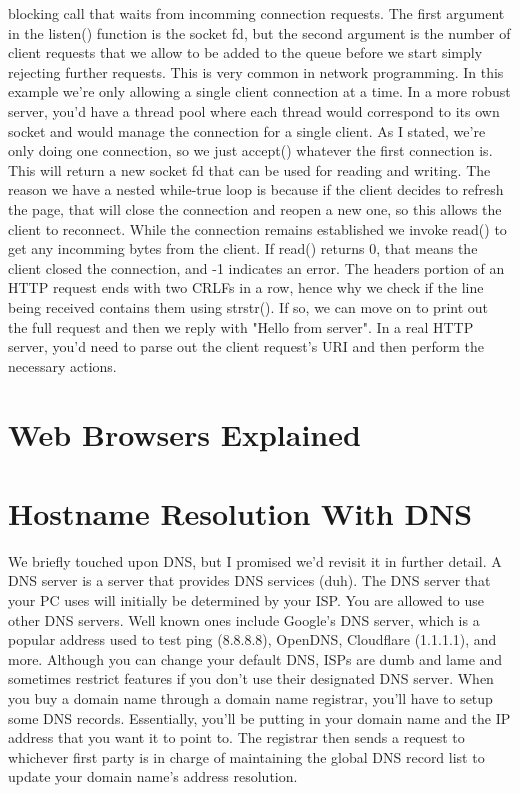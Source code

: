 \documentclass{article}
\begin{document}
blocking call that waits from incomming connection requests. The first argument in the listen() function is
the socket fd, but the second argument is the number of client requests that we allow to be added to the queue
before we start simply rejecting further requests. This is very common in network programming. In this example
we're only allowing a single client connection at a time. In a more robust server, you'd have a thread pool
where each thread would correspond to its own socket and would manage the connection for a single client.
As I stated, we're only doing one connection, so we just accept() whatever the first connection is. This will
return a new socket fd that can be used for reading and writing. The reason we have a nested while-true loop
is because if the client decides to refresh the page, that will close the connection and reopen a new one, so
this allows the client to reconnect. While the connection remains established we invoke read() to get any
incomming bytes from the client. If read() returns 0, that means the client closed the connection, and -1
indicates an error. The headers portion of an HTTP request ends with two CRLFs in a row, hence why we check
if the line being received contains them using strstr(). If so, we can move on to print out the full request
and then we reply with "Hello from server". In a real HTTP server, you'd need to parse out the client request's
URI and then perform the necessary actions.

\section{Web Browsers Explained}

\section{Hostname Resolution With DNS}

We briefly touched upon DNS, but I promised we'd revisit it in further detail. A DNS server is a server that
provides DNS services (duh). The DNS server that your PC uses will initially be determined by your ISP. You are
allowed to use other DNS servers. Well known ones include Google's DNS server, which is a popular address used
to test ping (8.8.8.8), OpenDNS, Cloudflare (1.1.1.1), and more. Although you can change your default DNS, ISPs
are dumb and lame and sometimes restrict features if you don't use their designated DNS server. When you buy a
domain name through a domain name registrar, you'll have to setup some DNS records. Essentially, you'll be
putting in your domain name and the IP address that you want it to point to. The registrar then sends a request
to whichever first party is in charge of maintaining the global DNS record list to update your domain name's
address resolution.
\end{document}
